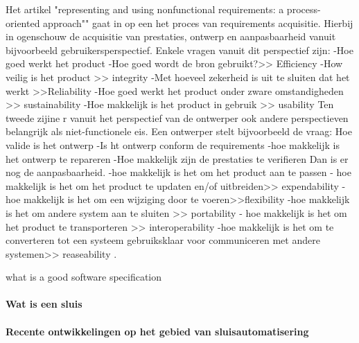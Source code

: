 Het artikel "representing and using nonfunctional requirements: a process-oriented approach"" gaat in op een het proces van requirements acquisitie. Hierbij in ogenschouw de acquisitie van prestaties, ontwerp en aanpasbaarheid vanuit bijvoorbeeld gebruikersperspectief. Enkele vragen vanuit dit perspectief zijn:
-Hoe goed werkt het product
-Hoe goed wordt de bron gebruikt?>> Efficiency
-How veilig is het product >> integrity
-Met hoeveel zekerheid is uit  te sluiten dat het werkt >>Reliability
-Hoe goed werkt het product onder zware omstandigheden >> sustainability
-Hoe makkelijk is het product in gebruik >> usability
 Ten tweede zijine r vanuit het perspectief van de ontwerper ook andere perspectieven  belangrijk als niet-functionele eis. Een ontwerper stelt bijvoorbeeld de vraag:
Hoe valide is het ontwerp
-Is ht ontwerp conform de requirements
-hoe makkelijk is het ontwerp te repareren
-Hoe makkelijk zijn de prestaties te verifieren
Dan is er nog de aanpasbaarheid.
-hoe makkelijk is het om het product aan te passen
- hoe makkelijk is het om het product te updaten en/of uitbreiden>> expendability
- hoe makkelijk is het om een wijziging door te voeren>>flexibility
-hoe makkelijk is het om andere system aan te sluiten >> portability
- hoe makkelijk is het om het product te transporteren >> interoperability
-hoe makkelijk is het om te converteren tot een systeem gebruiksklaar voor communiceren met andere systemen>> reaseability \cite{jonkerTreurKlush200informativeAgents}
\cite{boehmBoseLeeRequirementsNegotiations}
\cite{muHungJinLiu2013inconsistencyReqs}
\cite{hunterNuseibeh1996manageSpecs}
\cite{myloloupos1992representingReqs}
\cite{zavePamela4darkCorners}
\cite{zavePAmela1997regEngineering}.


what is a good software specification

\cite{fvaandrager2322010Goodmodel}
\cite{onix01102022devopmodel}
\cite{sulemani04012021softwareprocesmodel}
\cite{globalluxsoft18102017softdev}
\cite{wiegers30052022SRS}
\cite{muller06092020goodspecification}
\cite{informit30062008reqmanagement}
\cite{altexsoft15092020writingSRS}


\paragraph{Wat is een sluis}
\cite{woudagemaalSluizen}
\cite{bardetsluizenAmsterdam}
\cite{historischesluizen}
\paragraph{Recente ontwikkelingen op het gebied van sluisautomatisering}

